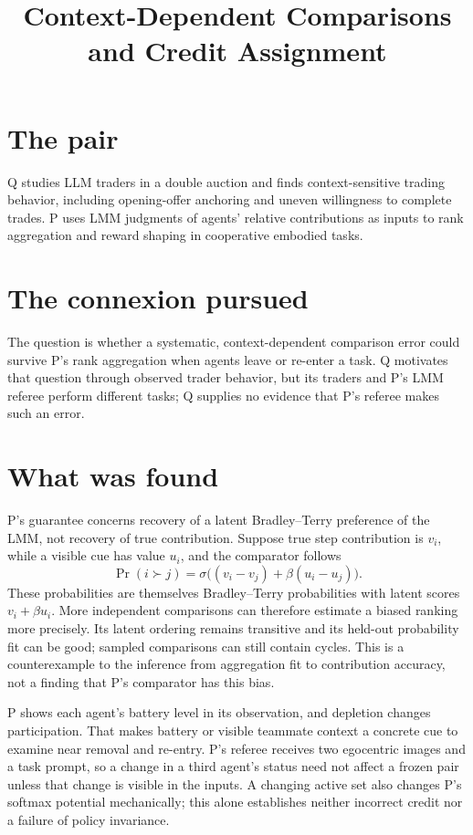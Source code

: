 \documentclass{article}
\title{Context-Dependent Comparisons and Credit Assignment}
\begin{document}
\maketitle

\section{The pair}

Q studies LLM traders in a double auction and finds context-sensitive trading behavior, including opening-offer anchoring and uneven willingness to complete trades. P uses LMM judgments of agents' relative contributions as inputs to rank aggregation and reward shaping in cooperative embodied tasks. 

\section{The connexion pursued}

The question is whether a systematic, context-dependent comparison error could survive P's rank aggregation when agents leave or re-enter a task. Q motivates that question through observed trader behavior, but its traders and P's LMM referee perform different tasks; Q supplies no evidence that P's referee makes such an error. 

\section{What was found}

P's guarantee concerns recovery of a latent Bradley--Terry preference of the LMM, not recovery of true contribution. Suppose true step contribution is \(v_i\), while a visible cue has value \(u_i\), and the comparator follows
\[
\Pr(i\succ j)
=
\sigma\bigl((v_i-v_j)+\beta(u_i-u_j)\bigr).
\]
These probabilities are themselves Bradley--Terry probabilities with latent scores \(v_i+\beta u_i\). More independent comparisons can therefore estimate a biased ranking more precisely. Its latent ordering remains transitive and its held-out probability fit can be good; sampled comparisons can still contain cycles. This is a counterexample to the inference from aggregation fit to contribution accuracy, not a finding that P's comparator has this bias. 

P shows each agent's battery level in its observation, and depletion changes participation. That makes battery or visible teammate context a concrete cue to examine near removal and re-entry. P's referee receives two egocentric images and a task prompt, so a change in a third agent's status need not affect a frozen pair unless that change is visible in the inputs. A changing active set also changes P's softmax potential mechanically; this alone establishes neither incorrect credit nor a failure of policy invariance. 
\end{document}
